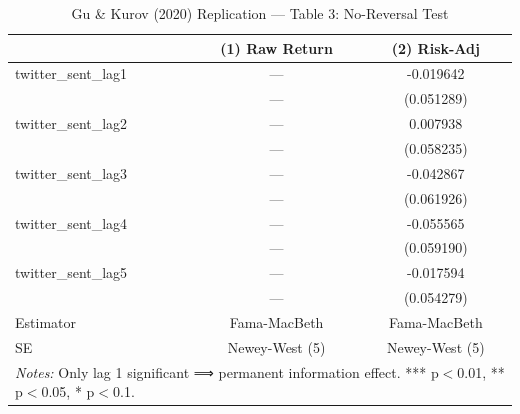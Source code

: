 \begin{table}[htbp]
\centering
\caption{Gu \& Kurov (2020) Replication --- Table 3: No-Reversal Test}
\label{tab:gk_t3}
\begin{tabular}{lcc}
\hline\hline
 & (1) Raw Return & (2) Risk-Adj \\
\hline
twitter\_sent\_lag1 & --- & -0.019642 \\
& --- & (0.051289) \\
twitter\_sent\_lag2 & --- & 0.007938 \\
& --- & (0.058235) \\
twitter\_sent\_lag3 & --- & -0.042867 \\
& --- & (0.061926) \\
twitter\_sent\_lag4 & --- & -0.055565 \\
& --- & (0.059190) \\
twitter\_sent\_lag5 & --- & -0.017594 \\
& --- & (0.054279) \\
\hline
Estimator & Fama-MacBeth & Fama-MacBeth \\
SE & Newey-West (5) & Newey-West (5) \\
\hline\hline
\multicolumn{3}{l}{\footnotesize \textit{Notes:} Only lag 1 significant ⟹ permanent information effect. *** p$<$0.01, ** p$<$0.05, * p$<$0.1.} \\
\end{tabular}
\end{table}
